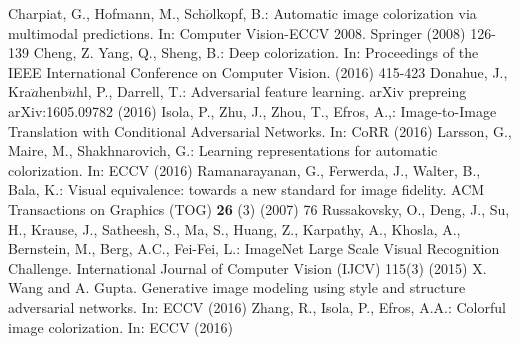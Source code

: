 \documentclass[10pt,twocolumn,letterpaper]{article}
\begin{document}
\begin{thebibliography}{1}

   Charpiat, G., Hofmann, M., Sch$\ddot{o}$lkopf, B.: Automatic image colorization via multimodal predictions. In: Computer Vision-ECCV 2008. Springer (2008) 126-139
  Cheng, Z. Yang, Q., Sheng, B.: Deep colorization. In: Proceedings of the IEEE International Conference on Computer Vision. (2016) 415-423
  Donahue, J., Kra$\ddot{a}$henb$\ddot{u}$hl, P., Darrell, T.: Adversarial feature learning. arXiv prepreing arXiv:1605.09782 (2016)
  Isola, P., Zhu, J., Zhou, T., Efros, A.,: Image-to-Image Translation with Conditional Adversarial Networks. In: CoRR (2016)
   Larsson, G., Maire, M., Shakhnarovich, G.: Learning representations for automatic colorization. In: ECCV (2016)
  Ramanarayanan, G., Ferwerda, J., Walter, B., Bala, K.: Visual equivalence: towards a new standard for image fidelity. ACM Transactions on Graphics (TOG) \textbf{26} (3) (2007) 76
  Russakovsky, O., Deng, J., Su, H., Krause, J., Satheesh, S., Ma, S., Huang, Z., Karpathy, A., Khosla, A., Bernstein, M., Berg, A.C., Fei-Fei, L.: ImageNet Large Scale Visual Recognition Challenge. International Journal of Computer Vision (IJCV) 115(3) (2015)
   X. Wang and A. Gupta. Generative image modeling using style and structure adversarial networks. In: ECCV (2016)
  Zhang, R., Isola, P., Efros, A.A.: Colorful image colorization. In: ECCV (2016)


 \end{thebibliography}
\end{document}
